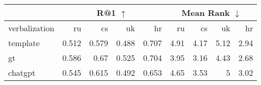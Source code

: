 \begin{tabular}{|l|rrrr|rrrr|} 
 \hline & \multicolumn{4}{c|}{R@1 $\uparrow$} & \multicolumn{4}{c|}{Mean Rank $\downarrow$} \\
\hline
 verbalization   &    ru &    cs &    uk &    hr &   ru &   cs &   uk &   hr \\
\hline
 template        & 0.512 & 0.579 & 0.488 & 0.707 & 4.91 & 4.17 & 5.12 & 2.94 \\
 gt              & 0.586 & 0.67  & 0.525 & 0.704 & 3.95 & 3.16 & 4.43 & 2.68 \\
 chatgpt         & 0.545 & 0.615 & 0.492 & 0.653 & 4.65 & 3.53 & 5    & 3.02 \\
\hline
\end{tabular}